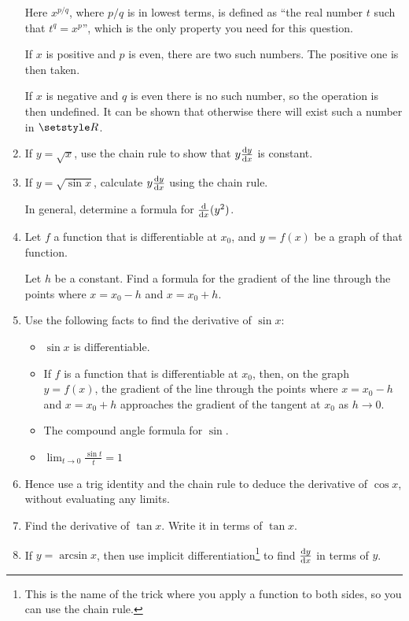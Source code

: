 \begin{enumerate}
  Here \(x^{p/q}\), where \(p/q\) is in lowest terms, is defined as ``the real
  number \(t\) such that \(t^q = x^p\)'', which is the only property you need
  for this question.

  If \(x\) is positive and \(p\) is even, there are two such numbers. The
  positive one is then taken.

  If \(x\) is negative and \(q\) is even there is no such number, so the
  operation is then undefined. It can be shown that otherwise there will exist
  such a number in \(\Reals\).
 \item
  If \(y = \sqrt x\), use the chain rule to show that \(y \dv<y>{x}\) is
  constant.
 \item
  If \(y = \sqrt{\sin x}\), calculate \(y \dv<y>{x}\) using the chain rule.

  In general, determine a formula for \(\dv{x}(y^2)\).
 \item
  Let \(f\) a function that is differentiable at \(x_0\), and \(y = f(x)\) be a
  graph of that function.

  Let \(h\) be a constant. Find a formula for the gradient of the line through
  the points where \(x = x_0 - h\) and \(x = x_0 + h\).
 \item
  Use the following facts to find the derivative of \(\sin x\):
  \begin{itemize}
   \item
    \(\sin x\) is differentiable.
   \item
    If \(f\) is a function that is differentiable at \(x_0\), then, on the graph
    \(y = f(x)\), the gradient of the line through the points where
    \(x = x_0 - h\) and \(x = x_0 + h\) approaches the gradient of the tangent
    at \(x_0\) as \(h \to 0\).
   \item
    The compound angle formula for \(\sin\).
   \item
    \(\displaystyle
     \lim_{t \to 0} \frac{\sin t} t = 1
     \)
  \end{itemize}
 \item
  Hence use a trig identity and the chain rule to deduce the derivative of
  \(\cos x\), without evaluating any limits.
 \item
  Find the derivative of \(\tan x\). Write it in terms of \(\tan x\).
 \item \label{q_calc_arcsin}
  If \(y = \arcsin x\), then use implicit differentiation\footnote{
   This is the name of the trick where you apply a function to both sides, so
   you can use the chain rule.
  } to find
  \(\dv<y>{x}\) in terms of \(y\).


\end{enumerate}

